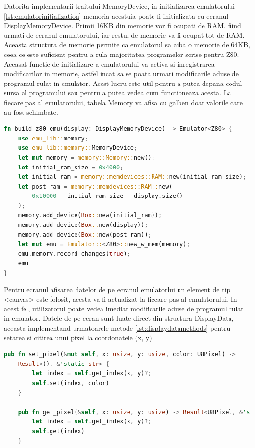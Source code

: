\documentclass[titlepage,12pt]{article}
\DeclareRobustCommand{\code}[1]{{\ttfamily\small #1}}
\begin{document}
Datorita implementarii traitului \code{MemoryDevice}, in initializarea emulatorului \cref{lst:emulatorinitialization} memoria acestuia poate fi initializata cu ecranul \code{DisplayMemoryDevice}.
Primii 16KB din memorie vor fi ocupati de \code{RAM}, fiind urmati de ecranul emulatorului, iar restul de memorie va fi ocupat tot de \code{RAM}. Aceasta structura de memorie permite ca emulatorul sa aiba o memorie de 64KB, ceea ce este suficient pentru a rula majoritatea programelor scrise pentru \ac {Z80}. Aceasat functie de initializare a emulatorului va activa si inregistrarea modificarilor in memorie, astfel incat sa se poata urmari modificarile aduse de programul rulat in emulator. Acest lucru este util pentru a putea depana codul sursa al programului sau pentru a putea vedea cum functioneaza acesta. La fiecare pas al emulatorului, tabela \code{Memory} va afisa cu galben doar valorile care au fost schimbate.
\begin{lstlisting}[language=Rust,caption={Initializarea emulatorului},label={lst:emulatorinitialization}]
fn build_z80_emu(display: DisplayMemoryDevice) -> Emulator<Z80> {
    use emu_lib::memory;
    use emu_lib::memory::MemoryDevice;
    let mut memory = memory::Memory::new();
    let initial_ram_size = 0x4000;
    let initial_ram = memory::memdevices::RAM::new(initial_ram_size);
    let post_ram = memory::memdevices::RAM::new(
        0x10000 - initial_ram_size - display.size()
    );
    memory.add_device(Box::new(initial_ram));
    memory.add_device(Box::new(display));
    memory.add_device(Box::new(post_ram));
    let mut emu = Emulator::<Z80>::new_w_mem(memory);
    emu.memory.record_changes(true);
    emu
}
\end{lstlisting}

Pentru ecranul afisarea datelor de pe ecranul emulatorlui un element de tip \code{<canvas>} este folosit, acesta va fi actualizat la fiecare pas al emulatorului. In acest fel, utilizatorul poate vedea imediat modificarile aduse de programul rulat in emulator. Datele de pe ecran sunt luate direct din structura \code {DisplayData}, aceasta implementand urmatoarele metode \cref {lst:displaydatamethods} pentru setarea si citirea unui pixel la coordonatele \code{(x, y)}:
\begin{lstlisting}[language=Rust,caption={Metodele de setare si citire a pixelilor},label={lst:displaydatamethods}]
pub fn set_pixel(&mut self, x: usize, y: usize, color: U8Pixel) ->
    Result<(), &'static str> {
        let index = self.get_index(x, y)?;
        self.set(index, color)
    }

    pub fn get_pixel(&self, x: usize, y: usize) -> Result<U8Pixel, &'static str> {
        let index = self.get_index(x, y)?;
        self.get(index)
    }
\end{lstlisting}
\end{document}
